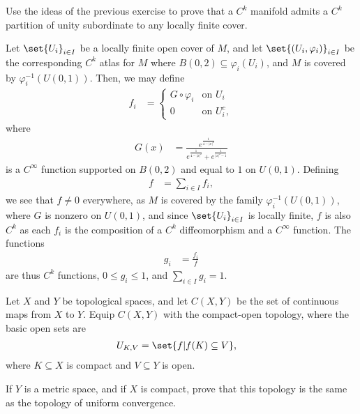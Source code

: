 \documentclass[10pt]{mypackage}
\begin{document}
\begin{problem}[Problem 6]
  Use the ideas of the previous exercise to prove that a $C^{k}$ manifold admits a $C^{k}$ partition of unity subordinate to any locally finite cover.
\end{problem}
\begin{solution}
  Let $\set{U_i}_{i\in I}$ be a locally finite open cover of $M$, and let $\set{\left( U_i,\varphi_i \right)}_{i\in I}$ be the corresponding $C^{k}$ atlas for $M$ where $B\left( 0,2 \right)\subseteq \varphi_{i} \left( U_i \right)$, and $M$ is covered by $\varphi_{i}^{-1}\left( U\left( 0,1 \right) \right)$. Then, we may define
  \begin{align*}
    f_i &= \begin{cases}
      G\circ \varphi_i & \text{on $U_i$}\\
      0 & \text{on $U_i^{c}$},
    \end{cases}
  \end{align*}
  where
  \begin{align*}
    G(x) &= \frac{e^{\frac{1}{4-\left\vert x \right\vert^2}}}{e^{\frac{1}{4-\left\vert x \right\vert^2}} + e^{ \frac{1}{\left\vert x \right\vert^2 - 1} }}
  \end{align*}
  is a $C^{\infty}$ function supported on $B\left( 0,2 \right)$ and equal to $1$ on $U\left( 0,1 \right)$. Defining
  \begin{align*}
    f &= \sum_{i\in I} f_i,
  \end{align*}
  we see that $f\neq 0$ everywhere, as $M$ is covered by the family $\varphi_{i}^{-1}\left( U\left( 0,1 \right) \right)$, where $G$ is nonzero on $U\left( 0,1 \right)$, and since $\set{U_i}_{i\in I}$ is locally finite, $f$ is also $C^{k}$ as each $f_i$ is the composition of a $C^{k}$ diffeomorphism and a $C^{\infty}$ function. The functions
  \begin{align*}
    g_i &= \frac{f_i}{f}
  \end{align*}
  are thus $C^{k}$ functions, $0\leq g_i \leq 1$, and $\sum_{i\in I} g_i = 1$.
\end{solution}
\begin{problem}[Problem 7]
  Let $X$ and $Y$ be topological spaces, and let $C\left( X,Y \right)$ be the set of continuous maps from $X$ to $Y$. Equip $C\left( X,Y \right)$ with the compact-open topology, where the basic open sets are
  \begin{align*}
    U_{K,V} &= \set{f | f(K)\subseteq V},
  \end{align*}
  where $K\subseteq X$ is compact and $V\subseteq Y$ is open.\newline

  If $Y$ is a metric space, and if $X$ is compact, prove that this topology is the same as the topology of uniform convergence.
\end{problem}
\end{document}
